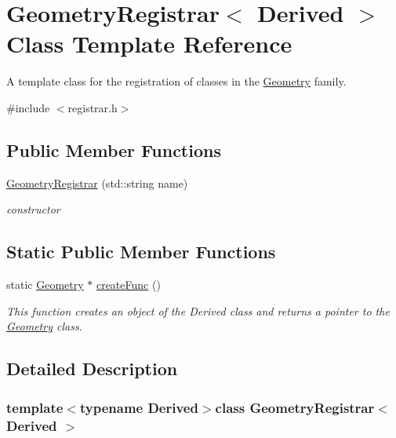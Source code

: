 \hypertarget{classGeometryRegistrar}{\section{Geometry\-Registrar$<$ Derived $>$ Class Template Reference}
\label{classGeometryRegistrar}
}


A template class for the registration of classes in the \hyperlink{classGeometry}{Geometry} family.  




{\ttfamily \#include $<$registrar.\-h$>$}

\subsection*{Public Member Functions}
\begin{DoxyCompactItemize}
\item 
\hyperlink{classGeometryRegistrar_a1cd23887471187da1ec3ffe28ea453a1}{Geometry\-Registrar} (std\-::string name)
\begin{DoxyCompactList}\small\item\em constructor \end{DoxyCompactList}\end{DoxyCompactItemize}
\subsection*{Static Public Member Functions}
\begin{DoxyCompactItemize}
\item 
static \hyperlink{classGeometry}{Geometry} $\ast$ \hyperlink{classGeometryRegistrar_aa75f76e90fe8a95a4cd60b3e32092c08}{create\-Func} ()
\begin{DoxyCompactList}\small\item\em This function creates an object of the {\itshape Derived} class and returns a pointer to the \hyperlink{classGeometry}{Geometry} class. \end{DoxyCompactList}\end{DoxyCompactItemize}


\subsection{Detailed Description}
\subsubsection*{template$<$typename Derived$>$class Geometry\-Registrar$<$ Derived $>$}


